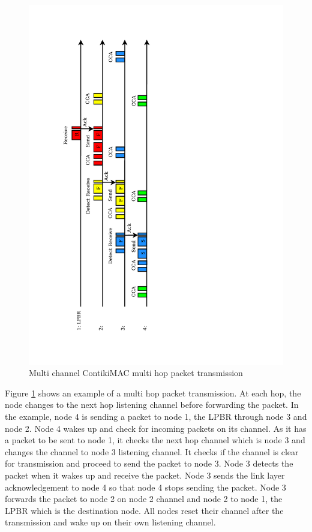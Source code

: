 \begin{figure}
\centering
\includegraphics[trim=2cm 2cm 10cm 2cm, clip=true, totalheight=0.6\textheight, angle=270]{macExample2.pdf}
\caption{Multi channel ContikiMAC multi hop packet transmission}
\label{fig_mac}
\end{figure}

Figure \ref{fig_mac} shows an example of a multi hop packet transmission. At each hop, the node changes to the next hop listening channel before forwarding the packet. In the example, node 4 is sending a packet to node 1, the LPBR through node 3 and node 2. Node 4 wakes up and check for incoming packets on its channel. As it has a packet to be sent to node 1, it checks the next hop channel which is node 3 and changes the channel to node 3 listening channel. It checks if the channel is clear for transmission and proceed to send the packet to node 3. Node 3 detects the packet when it wakes up and receive the packet. Node 3 sends the link layer acknowledgement to node 4 so that node 4 stops sending the packet. Node 3 forwards the packet to node 2 on node 2 channel and node 2 to node 1, the LPBR which is the destination node. All nodes reset their channel after the transmission and wake up on their own listening channel. 

